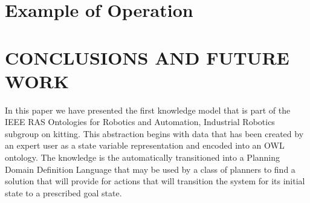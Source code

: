 
\section{Example of Operation}
\label{sect:Example}




\section{CONCLUSIONS AND FUTURE WORK}
\label{sect:Conclusions}
In this paper we have presented the first knowledge model that is part of the IEEE RAS Ontologies for Robotics and Automation, Industrial Robotics subgroup on kitting.
This abstraction begins with data that has been created by an expert user as a state variable representation and encoded into an OWL ontology. The knowledge
is the automatically transitioned into a Planning Domain Definition Language that may be used by a class of planners to find a solution that will provide for actions that will
transition the system for its initial state to a prescribed goal state.

